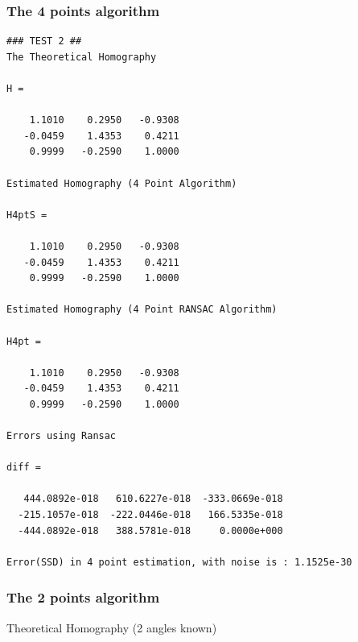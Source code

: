\documentclass[a4paper,12pt]{article}
\begin{document}
\subsubsection{The 4 points algorithm}
\begin{verbatim}
### TEST 2 ##
The Theoretical Homography

H =

    1.1010    0.2950   -0.9308
   -0.0459    1.4353    0.4211
    0.9999   -0.2590    1.0000

Estimated Homography (4 Point Algorithm)

H4ptS =

    1.1010    0.2950   -0.9308
   -0.0459    1.4353    0.4211
    0.9999   -0.2590    1.0000

Estimated Homography (4 Point RANSAC Algorithm)

H4pt =

    1.1010    0.2950   -0.9308
   -0.0459    1.4353    0.4211
    0.9999   -0.2590    1.0000

Errors using Ransac

diff =

   444.0892e-018   610.6227e-018  -333.0669e-018
  -215.1057e-018  -222.0446e-018   166.5335e-018
  -444.0892e-018   388.5781e-018     0.0000e+000

Error(SSD) in 4 point estimation, with noise is : 1.1525e-30
\end{verbatim}


\subsubsection{The 2 points algorithm}

Theoretical Homography (2 angles known)
\end{document}
